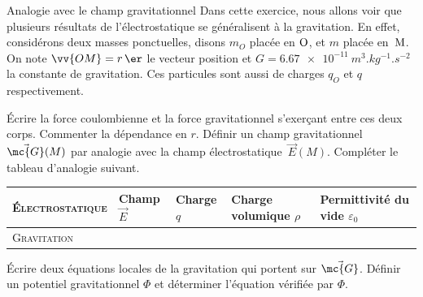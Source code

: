 \begin{exo}[PC][2][TD]{Analogie avec le champ gravitationnel}
Dans cette exercice, nous allons voir que plusieurs résultats de l'électrostatique se généralisent à la gravitation. En effet, considérons deux masses ponctuelles, disons $m_O$ placée en $\rm O$, et $m$ placée en~$\rm M$. On note $\vv{OM}=r\,\er$ le vecteur position et $G=\SI{6,67e-11}{m^3.kg^{-1}.s^{-2}}$ la constante de gravitation. Ces particules sont aussi de charges $q_O$ et $q$ respectivement.

\begin{quest}
\item Écrire la force coulombienne et la force gravitationnel s’exerçant entre ces deux corps. Commenter la dépendance en $r$. Définir un champ gravitationnel $\Vec{\mc{G}}(M)$ par analogie avec la champ électrostatique~$\Vec{E}(M)$. Compléter le tableau d’analogie suivant.
\begin{center}
\renewcommand{\arraystretch}{1.3}
\begin{tabular}{|l|l|l|l|l|}
\hline
\textsc{Électrostatique} & Champ $\Vec{E}$ & Charge $q$ & Charge volumique $\rho$ & Permittivité du vide $\varepsilon_0$ \\
\hline \textsc{Gravitation} & & & &  \\
\hline
\end{tabular}
\end{center}



\item Écrire deux équations locales de la gravitation qui portent sur $\Vec{\mc{G}}$. Définir un potentiel gravitationnel $\Phi$ et déterminer l’équation vérifiée par $\Phi$.


\end{quest}
\end{exo}
